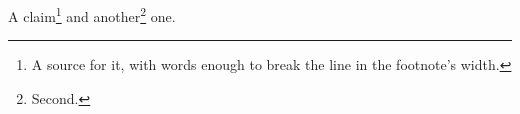 \documentclass{beamer}
\begin{document}
\begin{frame}
A claim\footnote{A source for it, with words enough to break the line in the footnote's width.} and another\footnote{Second.} one.
\end{frame}
\end{document}

